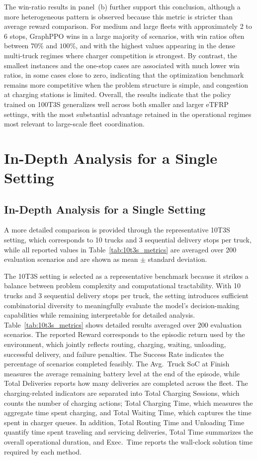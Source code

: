 \documentclass[journal]{IEEEtran}
\begin{document}
The win-ratio results in panel~(b) further support this conclusion, although a more heterogeneous pattern is observed because this metric is stricter than average reward comparison. For medium and large fleets with approximately 2 to 6 stops, GraphPPO wins in a large majority of scenarios, with win ratios often between $70\%$ and $100\%$, and with the highest values appearing in the dense multi-truck regimes where charger competition is strongest. By contrast, the smallest instances and the one-stop cases are associated with much lower win ratios, in some cases close to zero, indicating that the optimization benchmark remains more competitive when the problem structure is simple, and congestion at charging stations is limited. Overall, the results indicate that the policy trained on 100T3S generalizes well across both smaller and larger eTFRP settings, with the most substantial advantage retained in the operational regimes most relevant to large-scale fleet coordination.


\section{In-Depth Analysis for a Single Setting}

\subsection{In-Depth Analysis for a Single Setting}

A more detailed comparison is provided through the representative 10T3S setting, which corresponds to 10 trucks and 3 sequential delivery stops per truck, while all reported values in Table~\ref{tab:10t3s_metrics} are averaged over 200 evaluation scenarios and are shown as mean $\pm$ standard deviation.

The 10T3S setting is selected as a representative benchmark because it strikes a balance between problem complexity and computational tractability. With 10 trucks and 3 sequential delivery stops per truck, the setting introduces sufficient combinatorial diversity to meaningfully evaluate the model's decision-making capabilities while remaining interpretable for detailed analysis.
Table~\ref{tab:10t3s_metrics} shows detailed results averaged over 200 evaluation scenarios.
The reported {Reward} corresponds to the episodic return used by the environment, which jointly reflects routing, charging, waiting, unloading, successful delivery, and failure penalties. The {Success Rate} indicates the percentage of scenarios completed feasibly. The {Avg.\ Truck SoC at Finish} measures the average remaining battery level at the end of the episode, while {Total Deliveries} reports how many deliveries are completed across the fleet. The charging-related indicators are separated into {Total Charging Sessions}, which counts the number of charging actions; {Total Charging Time}, which measures the aggregate time spent charging, and {Total Waiting Time}, which captures the time spent in charger queues. In addition, {Total Routing Time} and {Unloading Time} quantify time spent traveling and servicing deliveries, {Total Time} summarizes the overall operational duration, and Exec.\ Time reports the wall-clock solution time required by each method.
\end{document}

